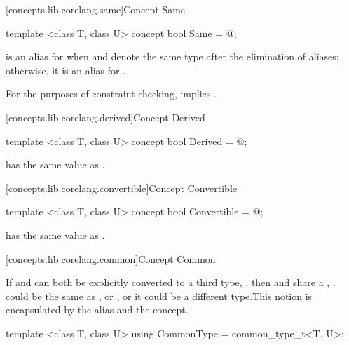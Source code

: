\begin{addedblock}
[concepts.lib.corelang.same]{Concept Same}

%
\begin{itemdecl}
template <class T, class U>
concept bool Same = @\seebelow@;
\end{itemdecl}

\begin{itemdescr}
\pnum
{} is an alias for  when  and 
denote the same type after the elimination of aliases; otherwise, it is an alias for
.

\pnum
\remarks For the purposes of constraint checking,  implies
.
\end{itemdescr}

[concepts.lib.corelang.derived]{Concept Derived}

%
\begin{itemdecl}
template <class T, class U>
concept bool Derived = @\seebelow@;
\end{itemdecl}

\begin{itemdescr}
\pnum
{} has the same value as .
\end{itemdescr}

[concepts.lib.corelang.convertible]{Concept Convertible}

%
\begin{itemdecl}
template <class T, class U>
concept bool Convertible = @\seebelow@;
\end{itemdecl}

\begin{itemdescr}
\pnum
{} has the same value as .
\end{itemdescr}

[concepts.lib.corelang.common]{Concept Common}

\pnum
If  and  can both be explicitly converted to a third type,
, then  and  share a ,
. \enternote {} could be the same as , or , or
it could be a different type.\exitnote This notion is encapsulated by the
 alias and the  concept.

%
\begin{itemdecl}
template <class T, class U>
using CommonType = common_type_t<T, U>;


\end{itemdecl}
\end{addedblock}
